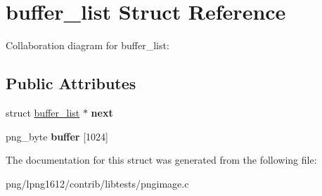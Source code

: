 \hypertarget{structbuffer__list}{\section{buffer\+\_\+list Struct Reference}
\label{structbuffer__list}
}


Collaboration diagram for buffer\+\_\+list\+:
\subsection*{Public Attributes}
\begin{DoxyCompactItemize}
\item 
\hypertarget{structbuffer__list_a70de863daa90d077c22428a01d228a31}{struct \hyperlink{structbuffer__list}{buffer\+\_\+list} $\ast$ {\bfseries next}}\label{structbuffer__list_a70de863daa90d077c22428a01d228a31}

\item 
\hypertarget{structbuffer__list_aefdd20a5c7d1cd4ef20eb54f4c990ccd}{png\+\_\+byte {\bfseries buffer} \mbox{[}1024\mbox{]}}\label{structbuffer__list_aefdd20a5c7d1cd4ef20eb54f4c990ccd}

\end{DoxyCompactItemize}


The documentation for this struct was generated from the following file\+:\begin{DoxyCompactItemize}
\item 
png/lpng1612/contrib/libtests/pngimage.\+c\end{DoxyCompactItemize}
